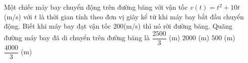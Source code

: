 \begin{ex}%
	Một chiếc máy bay chuyển động trên đường băng với vận tốc $v(t) =t^2 +10t$(m/s) với $t$ là thời gian tính theo đơn vị giây kể từ khi máy bay bắt đầu chuyển động. Biết khi máy bay đạt vận tốc $200$(m/s) thì nó rời đường băng. Quãng đường máy bay đã di chuyển trên đường băng là
	\choice 
	{\True $\dfrac{2500}{3}$ (m)}
	{$2000$ (m)}
	{$500$ (m)}
	{$\dfrac{4000}{3}$ (m)}
\end{ex}

